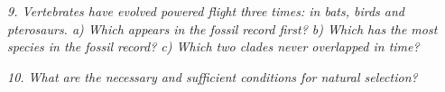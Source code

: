 \documentclass[11pt]{article}
\begin{document}
\emph{9. Vertebrates have evolved powered flight three times: in bats, birds and pterosaurs. a) Which appears in the fossil record first? b) Which has the most species in the fossil record? c) Which two clades never overlapped in time?}
\vspace{6cm}

\emph{10. What are the necessary and sufficient conditions for natural selection?}
\vspace{6cm}
\end{document}
